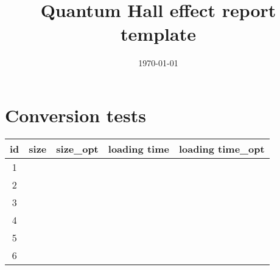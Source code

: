 \documentclass[a4paper]{article}
\title{Quantum Hall effect report template}
\date{\today}
\begin{document}
\section*{Conversion tests}

\begin{table}[h]
\begin{tabular}{ccccc}
id & size & size\_opt & loading time & loading time\_opt \\ \hline
1  &      &           &              &                   \\
2  &      &           &              &                   \\
3  &      &           &              &                   \\
4  &      &           &              &                   \\
5  &      &           &              &                   \\
6  &      &           &              &                  
\end{tabular}
\end{table}
\end{document}
